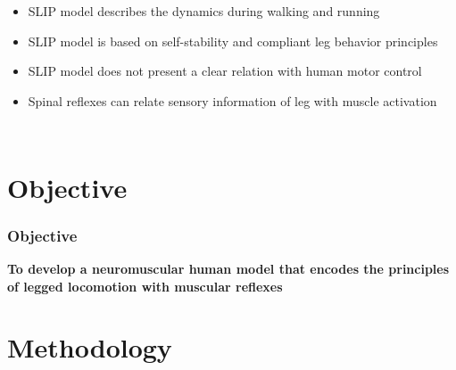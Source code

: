 \documentclass[10pt]{beamer}
\begin{document}
\begin{frame}
\begin{columns}
		\begin{itemize}
			\item SLIP model describes the dynamics during walking and running\footnotemark[1] \\[1em]
			\item SLIP model is based on self-stability and compliant leg behavior principles\footnotemark[2] \\[1em]
			\item SLIP model does not present a clear relation with human motor control\footnotemark[2] \\[1em]	
			\item Spinal reflexes can relate sensory information of leg with muscle activation\footnotemark[2]
		\end{itemize}
	\end{columns}
\end{frame}


\section{Objective}	
\begin{frame}
	\frametitle{Objective}
	\centering
	\LARGE
	\bf
	To develop a neuromuscular human model that encodes the principles of legged locomotion with muscular reflexes
\end{frame}

\section{Methodology}
\end{document}
